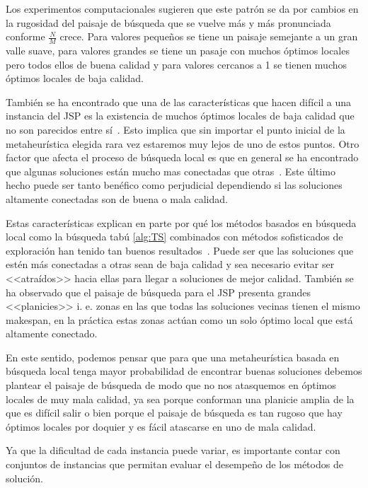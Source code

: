 Los experimentos computacionales sugieren que este patrón se da por cambios en la rugosidad del paisaje de búsqueda que se vuelve más y más pronunciada conforme $\frac{N}{M}$ crece.
%
Para valores pequeños se tiene un paisaje semejante a un gran valle suave, para valores grandes se tiene un pasaje con muchos óptimos locales pero todos ellos de buena calidad y 
para valores cercanos a 1 se tienen muchos óptimos locales de baja calidad.

También se ha encontrado que una de las características que hacen difícil a una instancia del JSP es la existencia de muchos óptimos locales de baja calidad que no son 
parecidos entre sí~\cite{mattfeld1999search}. 
%
Esto implica que sin importar el punto inicial de la metaheurística elegida rara vez estaremos muy lejos de uno de estos puntos. 
%
Otro factor que afecta el proceso de búsqueda local es que en general se ha encontrado que algunas soluciones están mucho mas conectadas que otras~\cite{bierwirth2004landscape}. 
%
Este último hecho puede ser tanto benéfico como perjudicial dependiendo si las soluciones altamente conectadas son de buena o mala calidad. 

Estas características explican en parte por qué los métodos basados en búsqueda local como la búsqueda tabú \ref{alg:TS} combinados con métodos sofisticados de exploración 
han tenido tan buenos resultados~\cite{watson2003problem}. 
%
Puede ser que las soluciones que estén más conectadas a otras sean de baja calidad y sea necesario evitar ser <<atraídos>> hacia ellas para llegar a soluciones de mejor calidad. 
%
También se ha observado que el paisaje de búsqueda para el JSP presenta grandes <<planicies>> i. e. zonas en las que todas las soluciones vecinas tienen el mismo makespan, 
en la práctica estas zonas actúan como un solo óptimo local que está altamente conectado.

En este sentido, podemos pensar que para que una metaheurística basada en búsqueda local tenga mayor probabilidad de encontrar buenas soluciones 
debemos plantear el paisaje de búsqueda de modo que no nos atasquemos en óptimos locales de muy mala calidad, ya sea porque conforman una planicie
amplia de la que es difícil salir o bien porque el paisaje de búsqueda es tan rugoso que hay óptimos locales por doquier y es fácil atascarse en uno de 
mala calidad. 

Ya que la dificultad de cada instancia puede variar, es importante contar con conjuntos de instancias que permitan evaluar el desempeño de los métodos de solución. 


